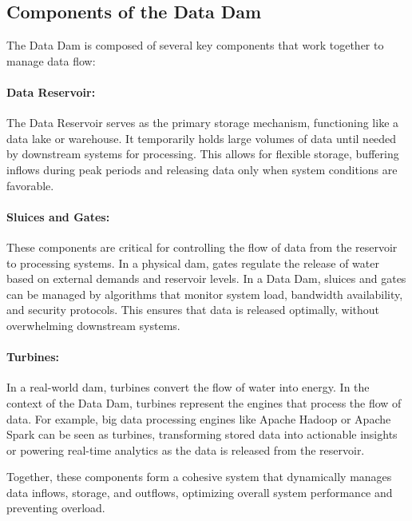 \subsection{Components of the Data Dam}

The Data Dam is composed of several key components that work together to manage data flow:

\paragraph{Data Reservoir:} The Data Reservoir serves as the primary storage mechanism, functioning like a data lake or warehouse. It temporarily holds large volumes of data until needed by downstream systems for processing. This allows for flexible storage, buffering inflows during peak periods and releasing data only when system conditions are favorable.

\paragraph{Sluices and Gates:} These components are critical for controlling the flow of data from the reservoir to processing systems. In a physical dam, gates regulate the release of water based on external demands and reservoir levels. In a Data Dam, sluices and gates can be managed by algorithms that monitor system load, bandwidth availability, and security protocols. This ensures that data is released optimally, without overwhelming downstream systems.

\paragraph{Turbines:} In a real-world dam, turbines convert the flow of water into energy. In the context of the  Data Dam, turbines represent the engines that process the flow of data. For example, big data processing engines like Apache Hadoop or Apache Spark can be seen as turbines, transforming stored data into actionable insights or powering real-time analytics as the data is released from the reservoir.

Together, these components form a cohesive system that dynamically manages data inflows, storage, and outflows, optimizing overall system performance and preventing overload.